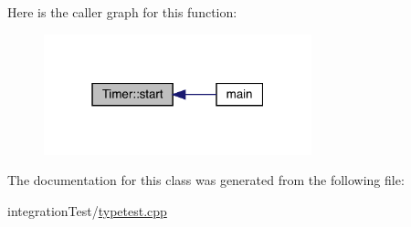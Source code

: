 Here is the caller graph for this function\+:
\nopagebreak
\begin{figure}[H]
\begin{center}
\leavevmode
\includegraphics[width=220pt]{class_timer_a3a8b5272198d029779dc9302a54305a8_icgraph}
\end{center}
\end{figure}


The documentation for this class was generated from the following file\+:\begin{DoxyCompactItemize}
\item 
integration\+Test/\mbox{\hyperlink{typetest_8cpp}{typetest.\+cpp}}\end{DoxyCompactItemize}
